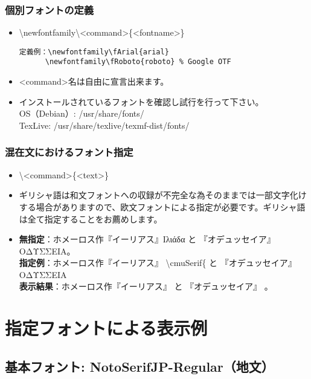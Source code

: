 \documentclass[a4paper,10pt]{ltjsarticle}
\def\colH#1{\color[HTML]{#1}}
\begin{document}
\subsubsection{個別フォントの定義}
\begin{itemize}
  \item[] {\colH{800000} \textbackslash newfontfamily\textbackslash<command>\{<fontname>\}}
\vspace{-2mm}
\begin{verbatim}
定義例：\newfontfamily\fArial{arial}
      \newfontfamily\fRoboto{roboto} % Google OTF
\end{verbatim} 
\vspace{-2mm}
  \item <command>名は自由に宣言出来ます。  
  \item インストールされているフォントを確認し試行を行って下さい。\\
OS（Debian）: /usr/share/fonts/\\
TexLive: /usr/share/texlive/texmf-dist/fonts/
\end{itemize}

\subsubsection{混在文におけるフォント指定}
\begin{itemize}
  \item[] {\colH{800000} \textbackslash <command>\{<text>\}}
  \item ギリシャ語は和文フォントへの収録が不完全な為そのままでは一部文字化けする場合がありますので、欧文フォントによる指定が必要です。ギリシャ語は全て指定することをお薦めします。
  \item[] 
  \textbf{無指定}：ホメーロス作『イーリアス』Ιλι{\colH{800000}ά}δα と 『オデュッセイア』ΟΔΥΣΣΕΙΑ。\\
  \textbf{指定例}：ホメーロス作『イーリアス』 {\colH{800000}\textbackslash cmuSerif\{}\cmuSerif{Ιλιάδα}{\colH{800000}\}} と 『オデュッセイア』ΟΔΥΣΣΕΙΑ\\
  \textbf{表示結果}：ホメーロス作『イーリアス』 と 『オデュッセイア』 。
\end{itemize}


\section{指定フォントによる表示例}
\subsection{基本フォント: \textcolor{rred}{NotoSerifJP-Regular}（地文）}
\end{document}
